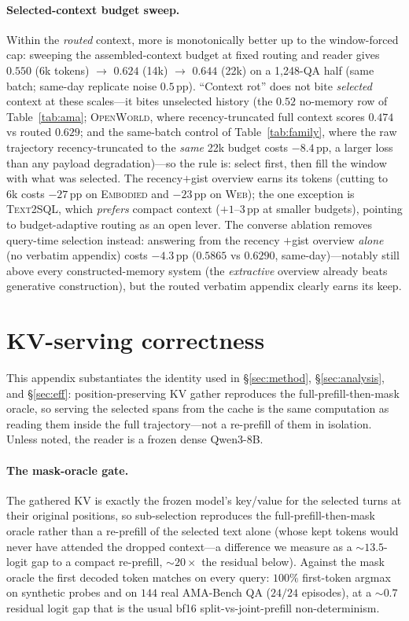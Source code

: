 \documentclass{article} %
\newcommand{\pp}{\,\mathrm{pp}}
\begin{document}
\paragraph{Selected-context budget sweep.}
Within the \emph{routed} context, more is monotonically better up to the
window-forced cap: sweeping the assembled-context budget at fixed routing and
reader gives $0.550$ (6k tokens) $\to$ $0.624$ (14k) $\to$ $0.644$ (22k) on a
1{,}248-QA half (same batch; same-day replicate noise $0.5\pp$). ``Context rot''
does not bite \emph{selected} context at these scales---it bites unselected history
(the $0.52$ no-memory row of Table~\ref{tab:ama}; \textsc{OpenWorld}, where
recency-truncated full context scores $0.474$ vs routed $0.629$; and the same-batch
control of Table~\ref{tab:family}, where the raw trajectory recency-truncated to the
\emph{same} 22k budget costs $-8.4\pp$, a larger loss than any payload
degradation)---so the rule is: select first, then fill the window with what was
selected. The recency$+$gist overview earns its tokens (cutting to 6k costs
$-27\pp$ on \textsc{Embodied} and $-23\pp$ on \textsc{Web}); the one exception is
\textsc{Text2SQL}, which \emph{prefers} compact context ($+1$--$3\pp$ at smaller
budgets), pointing to budget-adaptive routing as an open lever. The converse
ablation removes query-time selection instead: answering from the recency
$+$gist overview \emph{alone} (no verbatim appendix) costs $-4.3\pp$ ($0.5865$ vs
$0.6290$, same-day)---notably still above every constructed-memory system (the
\emph{extractive} overview already beats generative construction), but the routed
verbatim appendix clearly earns its keep.

\section{KV-serving correctness}
\label{app:kvcorrect}

This appendix substantiates the identity used in \S\ref{sec:method},
\S\ref{sec:analysis}, and \S\ref{sec:eff}: position-preserving KV gather
reproduces the full-prefill-then-mask oracle, so serving the selected spans from
the cache is the same computation as reading them inside the full trajectory---not
a re-prefill of them in isolation. Unless noted, the reader is a frozen dense
Qwen3-8B.

\paragraph{The mask-oracle gate.} The gathered KV is exactly the frozen model's
key/value for the selected turns at their original positions, so sub-selection
reproduces the full-prefill-then-mask oracle rather than a re-prefill of the
selected text alone (whose kept tokens would never have attended the dropped
context---a difference we measure as a $\sim\!13.5$-logit gap to a compact
re-prefill, $\sim\!20\times$ the residual below). Against the mask oracle the
first decoded token matches on every query: $100\%$ first-token argmax on
synthetic probes and on $144$ real AMA-Bench QA ($24/24$ episodes), at a
$\sim\!0.7$ residual logit gap that is the usual bf16 split-vs-joint-prefill
non-determinism.
\end{document}
